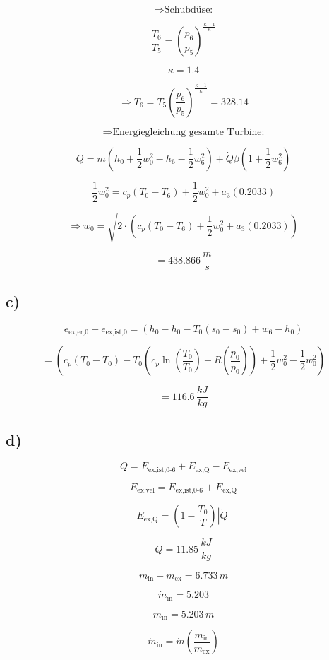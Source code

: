 \[
\Rightarrow \text{Schubdüse:}
\]

\[
\frac{T_6}{T_5} = \left( \frac{p_6}{p_5} \right)^{\frac{\kappa - 1}{\kappa}}
\]

\[
\kappa = 1.4
\]

\[
\Rightarrow T_6 = T_5 \left( \frac{p_6}{p_5} \right)^{\frac{\kappa - 1}{\kappa}} = 328.14
\]

\[
\Rightarrow \text{Energiegleichung gesamte Turbine:}
\]

\[
Q = \dot{m} \left( h_0 + \frac{1}{2} w_0^2 - h_6 - \frac{1}{2} w_6^2 \right) + \dot{Q} \beta \left( 1 + \frac{1}{2} w_6^2 \right)
\]

\[
\frac{1}{2} w_0^2 = c_p (T_0 - T_6) + \frac{1}{2} w_0^2 + a_3 (0.2033)
\]

\[
\Rightarrow w_0 = \sqrt{2 \cdot \left( c_p (T_0 - T_6) + \frac{1}{2} w_0^2 + a_3 (0.2033) \right)}
\]

\[
= 438.866 \, \frac{m}{s}
\]

\subsection*{c)}

\[
e_{\text{ex,er,0}} - e_{\text{ex,ist,0}} = (h_0 - h_0 - T_0 (s_0 - s_0) + w_6 - h_0)
\]

\[
= \left( c_p (T_0 - T_0) - T_0 \left( c_p \ln \left( \frac{T_0}{T_0} \right) - R \left( \frac{p_0}{p_0} \right) \right) + \frac{1}{2} w_0^2 - \frac{1}{2} w_0^2 \right)
\]

\[
= 116.6 \, \frac{kJ}{kg}
\]

\subsection*{d)}

\[
Q = E_{\text{ex,ist,0-6}} + E_{\text{ex,Q}} - E_{\text{ex,vel}}
\]

\[
E_{\text{ex,vel}} = E_{\text{ex,ist,0-6}} + E_{\text{ex,Q}}
\]

\[
E_{\text{ex,Q}} = \left( 1 - \frac{T_0}{T} \right) \left| \dot{Q} \right|
\]

\[
\dot{Q} = 11.85 \, \frac{kJ}{kg}
\]

\[
\dot{m}_{\text{in}} + \dot{m}_{\text{ex}} = 6.733 \, \dot{m}
\]

\[
\dot{m}_{\text{in}} = 5.203
\]

\[
\dot{m}_{\text{in}} = 5.203 \, \dot{m}
\]

\[
\dot{m}_{\text{in}} = \dot{m} \left( \frac{m_{\text{in}}}{m_{\text{ex}}} \right)
\]

